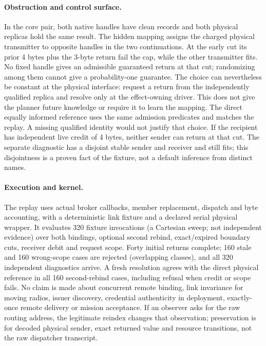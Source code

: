 \documentclass{article}
\begin{document}
\paragraph{Obstruction and control surface.}
In the core pair, both native handles have clean records and both
physical replicas hold the same result. The hidden mapping
assigns the charged physical transmitter to opposite handles in
the two continuations. At the early cut its prior 4 bytes plus the
3-byte return fail the cap, while the other transmitter fits.
No fixed handle gives an admissible guaranteed return at that cut;
randomizing among them cannot give a probability-one guarantee.
The choice can nevertheless be constant at the physical interface:
request a return from the independently qualified replica and resolve
only at the effect-owning driver. This does not give the planner
future knowledge or require it to learn the mapping. The direct
equally informed reference uses the same admission predicates and
matches the replay. A missing qualified identity would not justify
that choice. If the recipient has independent live credit of 4
bytes, neither sender can return at that cut. The separate
diagnostic has a disjoint stable sender and receiver and still
fits; this disjointness is a proven fact of the fixture, not a
default inference from distinct names.

\paragraph{Execution and kernel.}
The replay uses actual broker callbacks, member replacement,
dispatch and byte accounting, with a deterministic link fixture
and a declared serial physical wrapper. It evaluates 320 fixture
invocations (a Cartesian sweep; not independent evidence) over both
bindings, optional second rebind, exact/expired boundary cuts,
receiver debit and request scope. Forty initial returns complete;
160 stale and 160 wrong-scope cases are rejected (overlapping
classes), and all 320 independent diagnostics arrive. A fresh
resolution agrees with the direct physical reference in all 160
second-rebind cases, including refusal when credit or scope fails.
No claim is made about concurrent remote binding, link invariance
for moving radios, issuer discovery, credential authenticity in
deployment, exactly-once remote delivery or mission acceptance. If
an observer asks for the raw routing address, the legitimate
reindex changes that observation; preservation is for decoded
physical sender, exact returned value and resource transitions,
not the raw dispatcher transcript.
\end{document}
